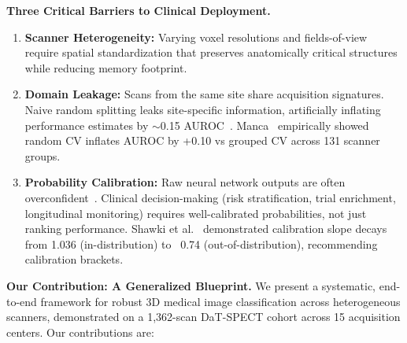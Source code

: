 \noindent\textbf{Three Critical Barriers to Clinical Deployment.}
\begin{enumerate}
    \item \textbf{Scanner Heterogeneity:} Varying voxel resolutions and fields-of-view require spatial standardization that preserves anatomically critical structures while reducing memory footprint.
    \item \textbf{Domain Leakage:} Scans from the same site share acquisition signatures. Naive random splitting leaks site-specific information, artificially inflating performance estimates by $\sim$0.15 AUROC~\cite{esteban2020leakage}. Manca~\cite{manca2024dat} empirically showed random CV inflates AUROC by +0.10 vs grouped CV across 131 scanner groups.
    \item \textbf{Probability Calibration:} Raw neural network outputs are often overconfident~\cite{guo2017calibration}. Clinical decision-making (risk stratification, trial enrichment, longitudinal monitoring) requires well-calibrated probabilities, not just ranking performance. Shawki et al.~\cite{shawki2024dat} demonstrated calibration slope decays from 1.036 (in-distribution) to ~0.74 (out-of-distribution), recommending calibration brackets.
\end{enumerate}

\noindent\textbf{Our Contribution: A Generalized Blueprint.}
We present a systematic, end-to-end framework for robust 3D medical image classification across heterogeneous scanners, demonstrated on a 1,362-scan DaT-SPECT cohort across 15 acquisition centers. Our contributions are:

